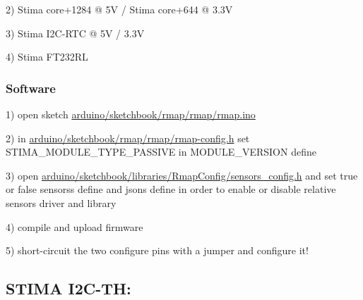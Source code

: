 2) Stima core+1284 @ 5V / Stima core+644 @ 3.\+3V

3) Stima I2\+C-\/\+R\+TC @ 5V / 3.\+3V

4) Stima F\+T232\+RL\hypertarget{index_stima_passive_software}{}\subsubsection{Software}\label{index_stima_passive_software}
1) open sketch \hyperlink{rmap_8ino}{arduino/sketchbook/rmap/rmap/rmap.\+ino}

2) in \hyperlink{rmap-config_8h}{arduino/sketchbook/rmap/rmap/rmap-\/config.\+h} set S\+T\+I\+M\+A\+\_\+\+M\+O\+D\+U\+L\+E\+\_\+\+T\+Y\+P\+E\+\_\+\+P\+A\+S\+S\+I\+VE in M\+O\+D\+U\+L\+E\+\_\+\+V\+E\+R\+S\+I\+ON define

3) open \hyperlink{sensors__config_8h}{arduino/sketchbook/libraries/\+Rmap\+Config/sensors\+\_\+config.\+h} and set true or false sensors\textquotesingle{}s define and json\textquotesingle{}s define in order to enable or disable relative sensor\textquotesingle{}s driver and library

4) compile and upload firmware

5) short-\/circuit the two configure pins with a jumper and configure it!\hypertarget{index_i2c-th}{}\subsection{S\+T\+I\+M\+A I2\+C-\/\+T\+H\+:}\label{index_i2c-th}
 
